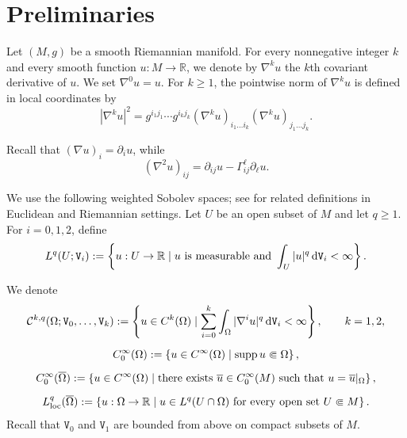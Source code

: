 \documentclass[reqno, 11pt, a4paper]{amsart}
\numberwithin{equation}{section}
\newcommand{\spt}{\operatorname{supp}}
\newcommand{\wghtv}{\mathtt{V}}
\newcommand{\dwv}{\textnormal{d} \mathtt{V}}
\newcommand{\loc}{\operatorname{loc}}
\newcommand{\qxp}{q}
\begin{document}


\section{Preliminaries} \label{141}

Let $(M,g)$ be a smooth Riemannian manifold. For every { nonnegative} integer $k$ and every smooth function $u:M\rightarrow\mathbb{R}$, we denote by $\nabla^k u$ the $k$th covariant derivative of $u$. {  We set $\nabla^0u=u$.} For $k\geq1$, the pointwise norm of $\nabla^k u$ is defined in local coordinates by
\[
{ 
\left|\nabla^k u\right|^2
=
g^{i_1j_1}\cdots g^{i_kj_k}
(\nabla^k u)_{i_1\ldots i_k}
(\nabla^k u)_{j_1\ldots j_k}.
}
\]

Recall that $(\nabla u)_i=\partial_i u$, while
\begin{equation}\label{137}
{ 
(\nabla^2u)_{ij}=\partial_{ij}u-\Gamma_{ij}^{\ell}\partial_{\ell}u.
}
\end{equation}

We use the following weighted Sobolev spaces; see \cite{kilpel1994weightedcapacity, turesson2000potential, hebey2000nonlinearanaly, kristaly2010variationalprinciples} for related definitions in Euclidean and Riemannian settings. Let $U$ be an open subset of $M$ and let $\qxp\geq1$. For $i=0,1,2$, define
\[
L^{\qxp}(U;\wghtv_i)
:=
\left\{
 u:U\rightarrow\mathbb{R}
 \mid
 u\text{ is measurable and }
 \int_U|u|^{\qxp}\,\dwv_i<\infty
\right\}.
\]

We denote
\begin{gather*}
{ 
\mathcal{C}^{k,\qxp}(\Omega;\wghtv_0,\ldots,\wghtv_k)
:=
\left\{
 u\in C^k(\Omega)
 \mid
 \sum_{i=0}^k\int_\Omega|\nabla^iu|^{\qxp}\,\dwv_i<\infty
\right\},
\qquad k=1,2,
}
\\[5pt]
{ 
C_0^\infty(\Omega)
:=
\left\{
 u\in C^\infty(\Omega)
 \mid
 \spt u\Subset\Omega
\right\},
}
\\[5pt]
C_0^\infty(\overline\Omega)
:=
\left\{
 u\in C^\infty(\Omega)
 \mid
 \text{there exists }\overline u\in C_0^\infty(M)
 \text{ such that }u=\overline u|_\Omega
\right\},
\\[5pt]
{ 
L^{\qxp}_{\loc}(\overline\Omega)
:=
\left\{
 u:\Omega\rightarrow\mathbb{R}
 \mid
 u\in L^{\qxp}(U\cap\Omega)
 \text{ for every open set }U\Subset M
\right\}.
}
\end{gather*}
Recall that $\wghtv_0$ and $\wghtv_1$ are bounded from above on compact subsets of $M$.
\end{document}
